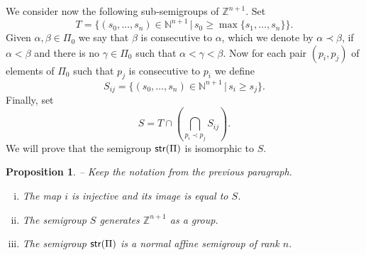 \documentclass[twoside,11pt]{article}
\newcommand{\N}{{\mathbb N}}
\newcommand{\Z}{{\mathbb Z}}
\newcommand{\StMon}{{\sf str}}
\newcommand{\tq}{\,|\,}
\newtheorem{subproposition}[subtheorem]{Proposition}
\begin{document}
We consider now the following sub-semigroups of $\Z^{n+1}$. Set 
\[
	T=\{(s_0,\dots,s_n)\in\N^{n+1} \tq s_0 \geq \max\{s_1,\dots,s_n\}\}.
\]
Given $\alpha,\beta \in \Pi_0$ we say that $\beta$ is consecutive to $\alpha$, which we
denote by $\alpha\prec\beta$, if $\alpha < \beta$ and there is no $\gamma\in\Pi_0$ such
that $\alpha < \gamma < \beta$. Now for each pair $(p_i,p_j)$ of elements of $\Pi_0$ such
that $p_j$ is consecutive to $p_i$ we define
\[ 
S_{ij} = \{(s_0,\dots,s_n)\in\N^{n+1} \tq s_i \ge s_j\}. 
\]
Finally, set
\[
S = T \cap \left(\bigcap_{p_i \prec p_j} S_{ij}\right). 
\]
We will prove that the semigroup $\StMon(\Pi)$ is isomorphic to $S$.
\begin{subproposition} -- \label{strPI-is-nasg}
Keep the notation from the previous paragraph.
\begin{enumerate}[(i)]
	\item The map $i$ is injective and its image is equal to $S$.
	\item The semigroup $S$ generates $\Z^{n+1}$ as a group.
	\item The semigroup $\StMon(\Pi)$ is a normal affine semigroup of rank $n$. 
\end{enumerate}
\end{subproposition}
\end{document}
